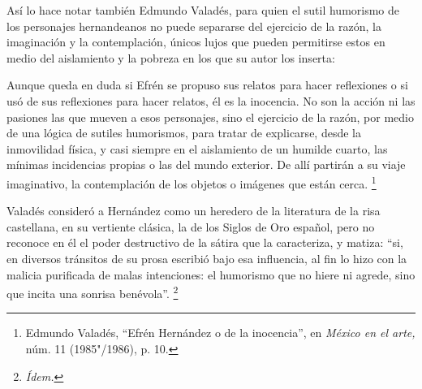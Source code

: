 \documentclass[14pt,twoside,final]{extbook} %
\let\oldfootnote\footnote
\renewcommand\footnote[1]{%
\oldfootnote{\hspace{1mm}#1}}
\begin{document}
Así lo hace notar también Edmundo Valadés, para quien el sutil humorismo de los personajes hernandeanos no puede separarse del ejercicio de la razón, la imaginación y la contemplación, únicos lujos que pueden permitirse estos en medio del aislamiento y la pobreza en los que su autor los inserta:
\begin{quoting}
Aunque queda en duda si Efrén se propuso sus relatos para hacer reflexiones o si usó de sus reflexiones para hacer relatos, él es la inocencia. No son la acción ni las pasiones las que mueven a esos personajes, sino el ejercicio de la razón, por medio de una lógica de sutiles humorismos, para tratar de explicarse, desde la inmovilidad física, y casi siempre en el aislamiento de un humilde cuarto, las mínimas incidencias propias o las del mundo exterior. De allí partirán a su viaje imaginativo, la contemplación de los objetos o imágenes que están cerca.\footnote{Edmundo Valadés, ``Efrén Hernández o de la inocencia'', en \emph{México en el arte,} núm. 11 (1985"/1986), p. 10.}
\end{quoting}
Valadés consideró a Hernández como un heredero de la literatura de la risa castellana, en su vertiente clásica, la de los Siglos de Oro español, pero no reconoce en él el poder destructivo de la sátira que la caracteriza, y matiza: ``si, en diversos tránsitos de su prosa escribió bajo esa influencia, al fin lo hizo con la malicia purificada de malas intenciones: el humorismo que no hiere ni agrede, sino que incita una sonrisa benévola''.\footnote{\em Ídem.}
\end{document}
